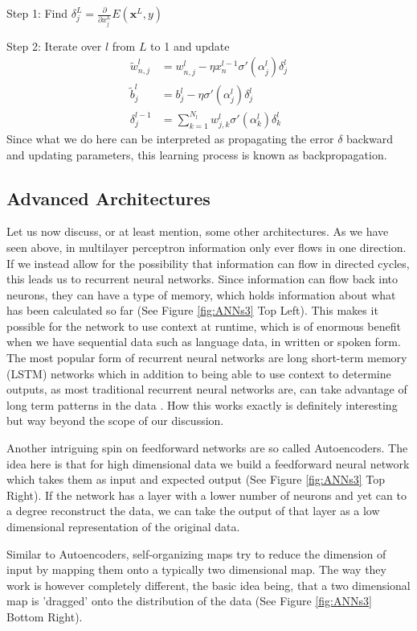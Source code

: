\documentclass[preprint,12pt,3p]{elsarticle}
\begin{document}
\smallskip
Step 1: Find $\delta_j^{L}=\frac{\partial}{\partial x^{L}_j}E(\mathbf{x}^L,y)$

Step 2: Iterate over $l$ from $L$ to 1 and update  
\begin{align*}
    \tilde{w}^l_{n,j}  &=w^l_{n,j}-\eta x_n^{l-1}\sigma'(\alpha^l_j)\delta_j^{l}\\
    \tilde{b}^l_{j}\phantom{al}    &=b^l_{j}-\eta\sigma'(\alpha^l_j)\delta_j^{l}\\
    \delta^{l-1}_j &=\sum_{k=1}^{N_{l}}w_{j,k}^{l}\sigma'(\alpha_k^{l})\delta^{l}_k
\end{align*}
Since what we do here can be interpreted as propagating the error $\delta$ backward and updating parameters, this learning process is known as backpropagation.

\subsection{Advanced Architectures}
Let us now discuss, or at least mention, some other architectures. As we have seen above, in multilayer perceptron information only ever flows in one direction. If we instead allow for the possibility that information can flow in directed cycles, this leads us to recurrent neural networks. Since information can flow back into neurons, they can have a type of memory, which holds information about what has been calculated so far (See Figure \ref{fig:ANNs3} Top Left). This makes it possible for the network to use context at runtime, which is of enormous benefit when we have sequential data such as language data, in written or spoken form. The most popular form of recurrent neural networks are long short-term memory (LSTM) networks which in addition to being able to use context to determine outputs, as most traditional recurrent neural networks are, can take advantage of long term patterns in the data \cite{hochreiter1997long}. How this works exactly is definitely interesting but way beyond the scope of our discussion.

Another intriguing spin on feedforward networks are so called Autoencoders. The idea here is that for high dimensional data we build a feedforward neural network which takes them as input and expected output (See Figure \ref{fig:ANNs3} Top Right). If the network has a layer with a lower number of neurons and yet can to a degree reconstruct the data, we can take the output of that layer as a low dimensional representation of the original data. 

Similar to Autoencoders, self-organizing maps try to reduce the dimension of input by mapping them onto a typically two dimensional map. The way they work is however completely different, the basic idea being, that a two dimensional map is 'dragged' onto the distribution of the data (See Figure \ref{fig:ANNs3} Bottom Right).
\end{document}

